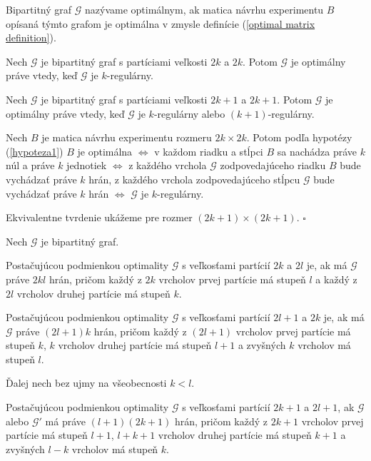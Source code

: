 \begin{defin}
Bipartitný graf $\mathcal{G}$ nazývame optimálnym, ak matica návrhu experimentu $B$ opísaná týmto grafom je optimálna v zmysle definície (\ref{optimal matrix definition}).
\end{defin}

\begin{hypoteza}
Nech $\mathcal{G}$ je bipartitný graf s partíciami veľkosti $2k$ a $2k$.
Potom $\mathcal{G}$ je optimálny práve vtedy, keď $\mathcal{G}$ je $k$-regulárny.

Nech $\mathcal{G}$ je bipartitný graf s partíciami veľkosti $2k + 1$ a $2k + 1$.
Potom $\mathcal{G}$ je optimálny práve vtedy, keď $\mathcal{G}$ je $k$-regulárny alebo $(k + 1)$-regulárny.
\end{hypoteza}

\begin{dokaz}
Nech $B$ je matica návrhu experimentu rozmeru $2k \times 2k$. Potom podľa hypotézy (\ref{hypoteza1})
$B$ je optimálna $\Leftrightarrow$ v každom riadku a stĺpci $B$ sa nachádza práve $k$ núl a práve $k$ jednotiek $\Leftrightarrow$
z každého vrchola $\mathcal{G}$ zodpovedajúceho riadku $B$ bude vychádzať práve $k$ hrán,
z každého vrchola zodpovedajúceho stĺpcu $\mathcal{G}$ bude vychádzať práve $k$ hrán $\Leftrightarrow$ $\mathcal{G}$ je $k$-regulárny.

Ekvivalentne tvrdenie ukážeme pre rozmer $(2k + 1) \times (2k + 1)$. $\square$
\end{dokaz}

\begin{hypoteza}
Nech $\mathcal{G}$ je bipartitný graf.

Postačujúcou podmienkou optimality $\mathcal{G}$ s veľkosťami partícií $2k$ a $2l$ je, ak má $\mathcal{G}$ práve $2kl$ hrán,
pričom každý z $2k$ vrcholov prvej partície má stupeň $l$ a každý z $2l$ vrcholov druhej partície má stupeň $k$.

Postačujúcou podmienkou optimality $\mathcal{G}$ s veľkosťami partícií $2l + 1$ a $2k$ je, ak má $\mathcal{G}$ práve $(2l + 1)k$ hrán,
pričom každý z $(2l + 1)$ vrcholov prvej partície má stupeň $k$, $k$ vrcholov druhej partície má stupeň $l + 1$ a zvyšných $k$ vrcholov má stupeň $l$.

Ďalej nech bez ujmy na všeobecnosti $k < l$.

Postačujúcou podmienkou optimality $\mathcal{G}$ s veľkosťami partícií $2k + 1$ a $2l + 1$, ak $\mathcal{G}$ alebo $\mathcal{G}'$ má práve $(l + 1)(2k + 1)$ hrán,
pričom každý z $2k + 1$ vrcholov prvej partície má stupeň $l + 1$, $l + k + 1$ vrcholov druhej partície má stupeň $k + 1$ a zvyšných $l - k$ vrcholov má stupeň $k$.
\end{hypoteza}

